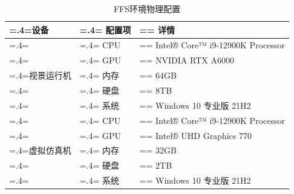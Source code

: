 \begin{table}[h!]
    \begin{center}
        \caption{FFS环境物理配置}
        \label{ffshard}
        \renewcommand\arraystretch{1.5}
        \begin{tabularx}{\textwidth}{ 
             >{\centering\arraybackslash\hsize=.4\hsize\linewidth=\hsize}X 
             >{\centering\arraybackslash\hsize=.4\hsize\linewidth=\hsize}X 
             >{\centering\arraybackslash\hsize=\hsize\linewidth=\hsize}X 
             }
             \hline
            \textbf{设备} & \textbf{配置项} & \textbf{详情}\\         
             \hline
             & CPU & Intel® Core™ i9-12900K Processor\\
           
             & GPU & NVIDIA RTX A6000\\
             
             视景运行机 & 内存 & 64GB\\
            
             & 硬盘 & 8TB\\
             
             & 系统 & Windows 10 专业版 21H2\\
             \hline
             & CPU & Intel® Core™ i9-12900K Processor\\
           
             & GPU & Intel® UHD Graphics 770\\
             
             虚拟仿真机 & 内存 & 32GB\\
            
             & 硬盘 & 2TB\\
             
             & 系统 & Windows 10 专业版 21H2\\
             \hline
             
            \end{tabularx}
    \end{center}
\end{table}
